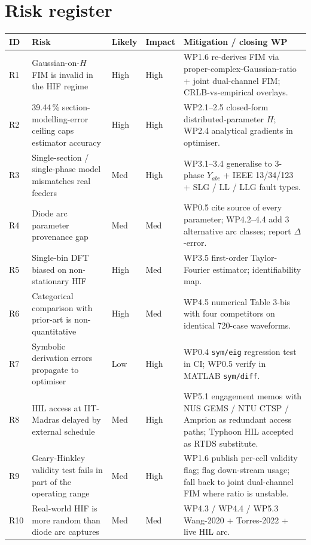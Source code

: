 \documentclass[11pt,a4paper]{article}
\begin{document}
\section{Risk register}

\renewcommand{\arraystretch}{1.10}
\begin{longtable}{L{0.6cm}L{4.2cm}L{1.2cm}L{1.2cm}L{6.4cm}}
\toprule{}
\textbf{ID} & \textbf{Risk} & \textbf{Likely} & \textbf{Impact} & \textbf{Mitigation / closing WP}\\\midrule\endhead
R1 & Gaussian-on-$H$ FIM is invalid in the HIF regime
   & High & High
   & WP1.6 re-derives FIM via proper-complex-Gaussian-ratio +
     joint dual-channel FIM; CRLB-vs-empirical overlays.\\
R2 & 39.44\,\% section-modelling-error ceiling caps estimator accuracy
   & High & High
   & WP2.1--2.5 closed-form distributed-parameter $H$; WP2.4 analytical
     gradients in optimiser.\\
R3 & Single-section / single-phase model mismatches real feeders
   & Med  & High
   & WP3.1--3.4 generalise to 3-phase $Y_{abc}$ + IEEE 13/34/123 + SLG /
     LL / LLG fault types.\\
R4 & Diode arc parameter provenance gap
   & Med  & Med
   & WP0.5 cite source of every parameter; WP4.2--4.4 add 3 alternative
     arc classes; report $\Delta$-error.\\
R5 & Single-bin DFT biased on non-stationary HIF
   & High & Med
   & WP3.5 first-order Taylor-Fourier estimator; identifiability map.\\
R6 & Categorical comparison with prior-art is non-quantitative
   & High & Med
   & WP4.5 numerical Table 3-bis with four competitors on identical
     720-case waveforms.\\
R7 & Symbolic derivation errors propagate to optimiser
   & Low  & High
   & WP0.4 \texttt{sym/eig} regression test in CI; WP0.5 verify in MATLAB
     \texttt{sym/diff}.\\
R8 & HIL access at IIT-Madras delayed by external schedule
   & Med  & High
   & WP5.1 engagement memos with NUS GEMS / NTU CTSP / Amprion as
     redundant access paths; Typhoon HIL accepted as RTDS substitute.\\
R9 & Geary-Hinkley validity test fails in part of the operating range
   & Med  & High
   & WP1.6 publish per-cell validity flag; flag down-stream usage; fall
     back to joint dual-channel FIM where ratio is unstable.\\
R10 & Real-world HIF is more random than diode arc captures
   & Med  & Med
   & WP4.3 / WP4.4 / WP5.3 Wang-2020 + Torres-2022 + live HIL arc.\\
\bottomrule
\end{longtable}
\end{document}
